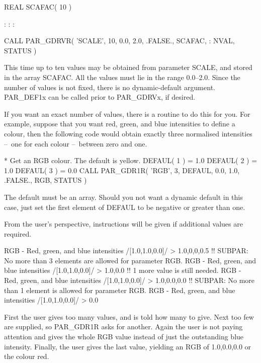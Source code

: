 \documentclass[twoside,11pt,nolof]{starlink}
\providecommand{\dash}{--}
\begin{document}
\begin{terminalv}
      REAL SCAFAC( 10 )

          :       :       :

      CALL PAR_GDRVR( 'SCALE', 10, 0.0, 2.0, .FALSE., SCAFAC,
     :                NVAL, STATUS )
\end{terminalv}

This time up to ten values may be obtained from parameter SCALE, and
stored in the array SCAFAC.  All the values must lie in the range
0.0\dash2.0.  Since the number of values is not fixed, there is no
dynamic-default argument.  PAR\_DEF1x can be called prior to PAR\_GDRVx,
if desired.

If you want an exact number of values, there is a routine to do this
for you.  For example, suppose that you want red, green, and blue
intensities to define a colour, then the following code would obtain
exactly three normalised intensities \dash\ one for each colour \dash\ between
zero and one.

\begin{terminalv}
*  Get an RGB colour.  The default is yellow.
      DEFAUL( 1 ) = 1.0
      DEFAUL( 2 ) = 1.0
      DEFAUL( 3 ) = 0.0
      CALL PAR_GDR1R( 'RGB', 3, DEFAUL, 0.0, 1.0, .FALSE., RGB, STATUS )
\end{terminalv}

The default must be an array.  Should you not want a dynamic default in
this case, just set the first element of DEFAUL to be negative or
greater than one.

From the user's perspective, instructions will be given if additional
values are required.

\begin{terminalv}
RGB - Red, green, and blue intensities /[1.0,1.0,0.0]/ > 1.0,0,0,0.5
!! SUBPAR: No more than 3 elements are allowed for parameter RGB.
RGB - Red, green, and blue intensities /[1.0,1.0,0.0]/ > 1.0,0.0
!! 1 more value is still needed.
RGB - Red, green, and blue intensities /[1.0,1.0,0.0]/ > 1.0,0.0,0.0
!! SUBPAR: No more than 1 element is allowed for parameter RGB.
RGB - Red, green, and blue intensities /[1.0,1.0,0.0]/ > 0.0
\end{terminalv}

First the user gives too many values, and is told how many to give.
Next too few are supplied, so PAR\_GDR1R asks for another.  Again
the user is not paying attention and gives the whole RGB value instead
of just the outstanding blue intensity.  Finally, the user gives the
last value, yielding an RGB of 1.0,0.0,0.0 or the colour red.
\end{document}
